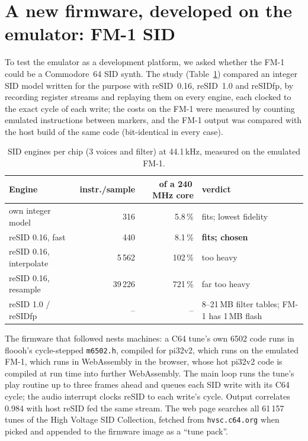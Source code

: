 \documentclass[10pt,a4paper]{article}
\newcommand{\code}[1]{\texttt{#1}}
\begin{document}
\section{A new firmware, developed on the emulator: FM-1 SID}

To test the emulator as a development platform, we asked whether the FM-1 could be a Commodore~64
SID synth. The study (Table~\ref{tab:sid}) compared an integer SID model written for the purpose
with reSID~0.16, reSID~1.0 and reSIDfp, by recording register streams and replaying them on every
engine, each clocked to the exact cycle of each write; the costs on the FM-1 were measured by
counting emulated instructions between markers, and the FM-1 output was compared with the host
build of the same code (bit-identical in every case).

\begin{table}[h]
\centering\footnotesize
\begin{tabular}{@{}lrrl@{}}
\toprule
Engine & instr./sample & of a 240\,MHz core & verdict\\
\midrule
own integer model & 316 & 5.8\,\% & fits; lowest fidelity\\
reSID 0.16, fast & 440 & 8.1\,\% & \textbf{fits; chosen}\\
reSID 0.16, interpolate & 5\,562 & 102\,\% & too heavy\\
reSID 0.16, resample & 39\,226 & 721\,\% & far too heavy\\
reSID 1.0 / reSIDfp & -- & -- & 8--21\,MB filter tables; FM-1 has 1\,MB flash\\
\bottomrule
\end{tabular}
\caption{SID engines per chip (3 voices and filter) at 44.1\,kHz, measured on the emulated FM-1.}
\label{tab:sid}
\end{table}

The firmware that followed nests machines: a C64 tune's own 6502 code runs in floooh's cycle-stepped
\code{m6502.h}, compiled for pi32v2, which runs on the emulated FM-1, which runs in WebAssembly in the
browser, whose hot pi32v2 code is compiled at run time into further WebAssembly. The main loop runs
the tune's play routine up to three frames ahead and queues each SID write with its C64 cycle; the
audio interrupt clocks reSID to each write's cycle. Output correlates 0.984 with host reSID fed the
same stream. The web page searches all 61\,157 tunes of the High Voltage SID Collection, fetched
from \code{hvsc.c64.org} when picked and appended to the firmware image as a ``tune pack''.
\end{document}
